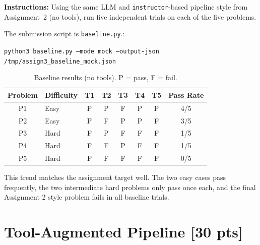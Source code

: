 \documentclass[12pt]{article}
\begin{document}
\textbf{Instructions:} Using the same LLM and \texttt{instructor}-based
pipeline style from Assignment~2 (no tools), run five independent trials on each of the five problems.

\medskip
\noindent
The submission script is \texttt{baseline.py}.:
\begin{center}
\texttt{python3 baseline.py --mode mock --output-json /tmp/assign3\_baseline\_mock.json}
\end{center}

\begin{table}[h]
    \centering
    \begin{tabular}{clcccccc}
        \toprule
        \textbf{Problem} & \textbf{Difficulty} & \textbf{T1} & \textbf{T2}
          & \textbf{T3} & \textbf{T4} & \textbf{T5}
          & \textbf{Pass Rate} \\
        \midrule
        P1 & Easy  & P & P & F & P & P & 4/5 \\
        P2 & Easy  & P & F & P & P & F & 3/5 \\
        P3 & Hard  & F & P & F & F & F & 1/5 \\
        P4 & Hard  & F & F & P & F & F & 1/5 \\
        P5 & Hard  & F & F & F & F & F & 0/5 \\
        \bottomrule
    \end{tabular}
    \caption{Baseline results (no tools). P = pass, F = fail.}
\end{table}

\noindent
This trend matches the assignment target well. The two easy cases pass frequently, the two
intermediate hard problems only pass once each, and the final Assignment 2 style problem fails in
all baseline trials.

\medskip

\newpage
\section{Tool-Augmented Pipeline \textnormal{[30 pts]}}
\label{sec:tools_filled}
\end{document}
